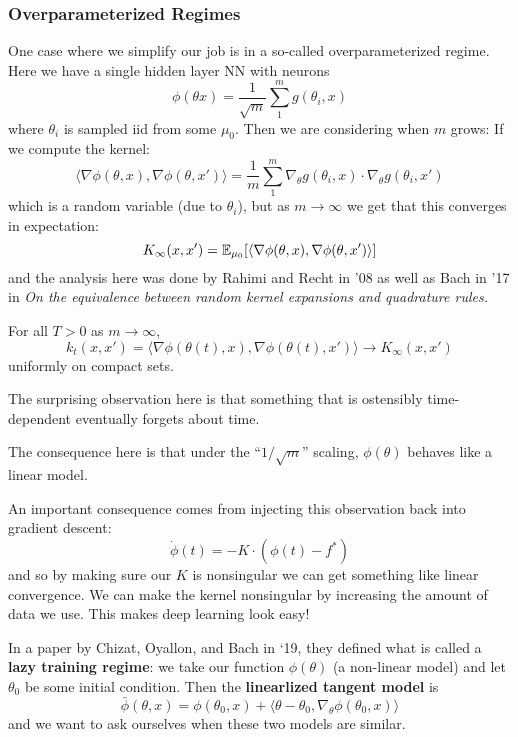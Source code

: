 \documentclass[12pt]{article}
\begin{document}
\subsubsection{Overparameterized Regimes}
One case where we simplify our job is in a so-called overparameterized regime. Here we have a single hidden layer NN with neurons 
\[\phi(\theta x)=\frac{1}{\sqrt{m}}\sum_1^m g(\theta_i,x)\]
where $\theta_i$ is sampled iid from some $\mu_0$. Then we are considering when $m$ grows: If we compute the kernel:
\[\langle \nabla\phi(\theta,x),\nabla\phi(\theta,x')\rangle=\frac{1}{m}\sum_1^m\nabla_\theta g(\theta_i,x)\cdot\nabla_\theta g(\theta_i,x')\]
which is a random variable (due to $\theta_i$), but as $m\to\infty$ we get that this converges in expectation:
\[K_\infty(x,x')=\mathbb{E}_{\mu_0}[\langle \nabla\phi(\theta,x),\nabla\phi(\theta,x')\rangle]\]
and the analysis here was done by Rahimi and Recht in '08 as well as Bach in '17 in \textit{On the equivalence between random kernel expansions and quadrature rules.}

\begin{thm}
	For all $T>0$ as $m\to\infty$, 
	\[k_t(x,x')=\langle \nabla\phi(\theta(t),x),\nabla\phi(\theta(t),x')\rangle\to K_\infty(x,x')\]
	uniformly on compact sets.
\end{thm}
\begin{rmk}
	The surprising observation here is that something that is ostensibly time-dependent eventually forgets about time.
\end{rmk}
\begin{rmk}
	The consequence here is that under the ``$1/\sqrt{m}$'' scaling, $\phi(\theta)$ behaves like a linear model.
\end{rmk}
An important consequence comes from injecting this observation back into gradient descent:
\[\dot\phi(t)=-K\cdot(\phi(t)-f^\ast)\]
and so by making sure our $K$ is nonsingular we can get something like linear convergence. We can make the kernel nonsingular by increasing the amount of data we use.
This makes deep learning look easy!

In a paper by Chizat, Oyallon, and Bach in `19, they defined what is called a \textbf{lazy training regime}: we take our function $\phi(\theta)$ (a non-linear model) and let $\theta_0$ be some initial condition. Then the \textbf{linearlized tangent model} is
\[\bar\phi(\theta,x)=\phi(\theta_0,x)+\langle\theta-\theta_0,\nabla_\theta\phi(\theta_0,x)\rangle\]
and we want to ask ourselves when these two models are similar.
\end{document}
